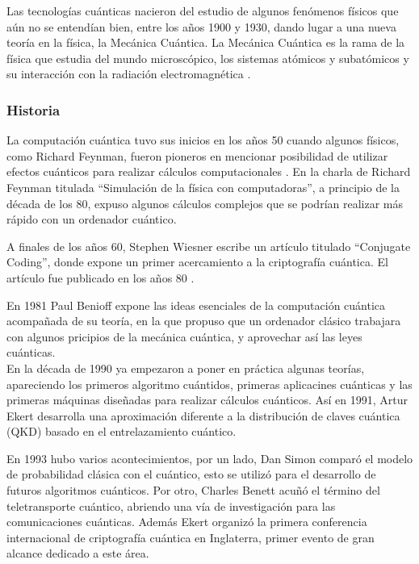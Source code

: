 Las tecnologías cuánticas nacieron del estudio de algunos fenómenos físicos que aún no se entendían bien, entre los años 1900 y 1930, dando lugar a una nueva teoría en la física, la Mecánica Cuántica. La Mecánica Cuántica es la rama de la física que estudia del mundo microscópico, los sistemas atómicos y subatómicos y su interacción con la radiación electromagnética \cite{mecanica-cuantica}.\\

\subsubsection{Historia}

La computación cuántica tuvo sus inicios en los años 50 cuando algunos físicos, como Richard Feynman, fueron pioneros en mencionar posibilidad de utilizar efectos cuánticos para realizar cálculos computacionales \cite{computacion-cuantica-wiki}. En la charla de Richard Feynman titulada ``Simulación de la física con computadoras'', a principio de la década de los 80, expuso algunos cálculos complejos que se podrían realizar más rápido con un ordenador cuántico. 


A finales de los años 60, Stephen Wiesner escribe un artículo titulado ``Conjugate Coding'', donde expone un primer acercamiento a la criptografía cuántica. El artículo fue publicado en los años 80 \cite{computacion-cuantica-crono}.

En 1981 Paul Benioff expone las ideas esenciales de la computación cuántica acompañada de su teoría, en la que propuso que un ordenador clásico trabajara con algunos pricipios de la mecánica cuántica, y aprovechar así las leyes cuánticas.\\


En la década de 1990 ya empezaron a poner en práctica algunas teorías, apareciendo los primeros algoritmo cuántidos, primeras aplicacines cuánticas y las primeras máquinas diseñadas para realizar cálculos cuánticos. Así en 1991, Artur Ekert desarrolla una aproximación diferente a la distribución de claves cuántica (QKD) basado en el entrelazamiento cuántico.

En 1993 hubo varios acontecimientos, por un lado, Dan Simon comparó el modelo de probabilidad clásica con el cuántico, esto se utilizó para el desarrollo de futuros algoritmos cuánticos. Por otro, Charles Benett acuñó el término del teletransporte cuántico, abriendo una vía de investigación para las comunicaciones cuánticas. Además Ekert organizó la primera conferencia internacional de criptografía cuántica en Inglaterra, primer evento de gran alcance dedicado a este área.

